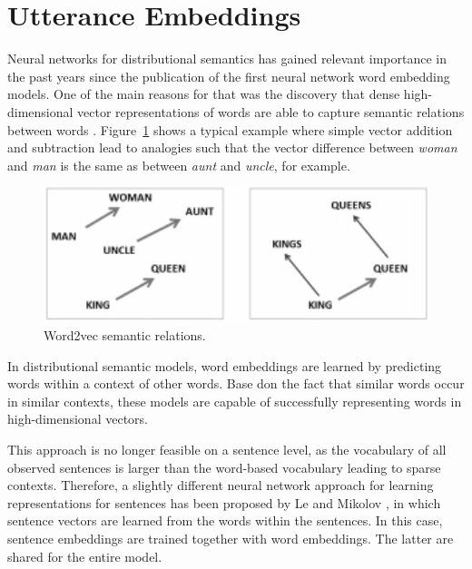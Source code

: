 \section{Utterance Embeddings}\label{sec:utt2vec}
Neural networks for distributional semantics has gained relevant importance in the past years since the publication of the first neural network word embedding models. One of the main reasons for that was the discovery that dense high-dimensional vector representations of words are able to capture semantic relations between words \cite{mikolov2013efficient}.  Figure~\ref{fig:w2v_example} shows a typical example where simple vector addition and subtraction lead to analogies such that the vector difference between \textit{woman} and \textit{man} is the same as between \textit{aunt} and \textit{uncle}, for example.


\begin{figure}
\centering
\begin{minipage}{.4\textwidth}
\includegraphics[width=1\textwidth]{img/w2v_example}
\caption{Word2vec semantic relations.}
\label{fig:w2v_example}
\end{minipage}
\end{figure}

In distributional semantic models, word embeddings are learned by predicting words within a context of other words. Base don the fact that similar words occur in similar contexts, these models are capable of successfully representing words in high-dimensional vectors.

This approach is no longer feasible on a sentence level, as the vocabulary of all observed sentences is larger than the word-based vocabulary leading to sparse contexts. Therefore, a slightly different neural network approach for learning representations for sentences has been proposed by Le and Mikolov , in which sentence vectors are learned from the words within the sentences.  In this case, sentence embeddings are trained together with word embeddings. The latter are shared for the entire model.

